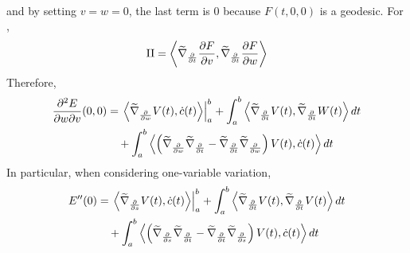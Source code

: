 \begin{enumerate}[label=\arabic{*}.]
\begin{equation*}
\begin{aligned}
		\end{aligned}
	\end{equation*}
	and by setting $v=w=0$, the last term is $0$ because $F(t,0,0)$ is a geodesic. For ,
	\begin{equation*}
		\text{\RNum{2}} = \inn{\widetilde{\nabla}_{\frac{\partial}{\partial t}}\frac{\partial F}{\partial v}, \widetilde{\nabla}_{\frac{\partial}{\partial t}}\frac{\partial F}{\partial w}}
	\end{equation*}
	Therefore,
	\begin{equation*}
		\begin{aligned}
			\frac{\partial^2 E}{\partial w \partial v}(0,0) &= \left.\left\langle \widetilde{\nabla}_{\frac{\partial}{\partial w}}V(t),\dot{c}(t) \right\rangle\right\lvert_a^b + \int_a^b\left\langle \widetilde{\nabla}_{\frac{\partial}{\partial t}}V(t), \widetilde{\nabla}_{\frac{\partial}{\partial t}}W(t) \right\rangle dt\\
			&\quad + \int_a^b\left\langle \left(\widetilde{\nabla}_{\frac{\partial}{\partial w}}\widetilde{\nabla}_{\frac{\partial}{\partial t}} - \widetilde{\nabla}_{\frac{\partial}{\partial t}}\widetilde{\nabla}_{\frac{\partial}{\partial w}}\right)V(t), \dot{c}(t) \right\rangle dt
		\end{aligned}
	\end{equation*}
	In particular, when considering one-variable variation,
	\begin{equation*}
		\begin{aligned}
			E^{\prime\prime}(0) &= \left.\left\langle \widetilde{\nabla}_{\frac{\partial}{\partial s}}V(t),\dot{c}(t) \right\rangle\right\lvert_a^b + \int_a^b\left\langle \widetilde{\nabla}_{\frac{\partial}{\partial t}}V(t), \widetilde{\nabla}_{\frac{\partial}{\partial t}}V(t) \right\rangle dt\\
			&\quad + \int_a^b\left\langle \left(\widetilde{\nabla}_{\frac{\partial}{\partial s}}\widetilde{\nabla}_{\frac{\partial}{\partial t}} - \widetilde{\nabla}_{\frac{\partial}{\partial t}}\widetilde{\nabla}_{\frac{\partial}{\partial s}}\right)V(t), \dot{c}(t) \right\rangle dt
		\end{aligned}
	\end{equation*}


\end{enumerate}
